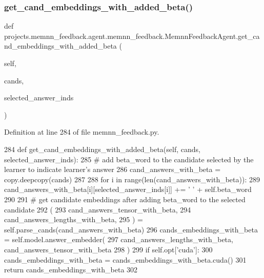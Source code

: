 \subsubsection{\texorpdfstring{get\+\_\+cand\+\_\+embeddings\+\_\+with\+\_\+added\+\_\+beta()}{get\_cand\_embeddings\_with\_added\_beta()}}
{\footnotesize\ttfamily def projects.\+memnn\+\_\+feedback.\+agent.\+memnn\+\_\+feedback.\+Memnn\+Feedback\+Agent.\+get\+\_\+cand\+\_\+embeddings\+\_\+with\+\_\+added\+\_\+beta (\begin{DoxyParamCaption}\item[{}]{self,  }\item[{}]{cands,  }\item[{}]{selected\+\_\+answer\+\_\+inds }\end{DoxyParamCaption})}



Definition at line 284 of file memnn\+\_\+feedback.\+py.


\begin{DoxyCode}
284     \textcolor{keyword}{def }get\_cand\_embeddings\_with\_added\_beta(self, cands, selected\_answer\_inds):
285         \textcolor{comment}{# add beta\_word to the candidate selected by the learner to indicate learner's answer}
286         cand\_answers\_with\_beta = copy.deepcopy(cands)
287 
288         \textcolor{keywordflow}{for} i \textcolor{keywordflow}{in} range(len(cand\_answers\_with\_beta)):
289             cand\_answers\_with\_beta[i][selected\_answer\_inds[i]] += \textcolor{stringliteral}{' '} + self.beta\_word
290 
291         \textcolor{comment}{# get candidate embeddings after adding beta\_word to the selected candidate}
292         (
293             cand\_answers\_tensor\_with\_beta,
294             cand\_answers\_lengths\_with\_beta,
295         ) = self.parse\_cands(cand\_answers\_with\_beta)
296         cands\_embeddings\_with\_beta = self.model.answer\_embedder(
297             cand\_answers\_lengths\_with\_beta, cand\_answers\_tensor\_with\_beta
298         )
299         \textcolor{keywordflow}{if} self.opt[\textcolor{stringliteral}{'cuda'}]:
300             cands\_embeddings\_with\_beta = cands\_embeddings\_with\_beta.cuda()
301         \textcolor{keywordflow}{return} cands\_embeddings\_with\_beta
302 
\end{DoxyCode}
\mbox{\label{classprojects_1_1memnn__feedback_1_1agent_1_1memnn__feedback_1_1MemnnFeedbackAgent_ad641f1d7c6d29c713c48a41ad8369c49}} 
